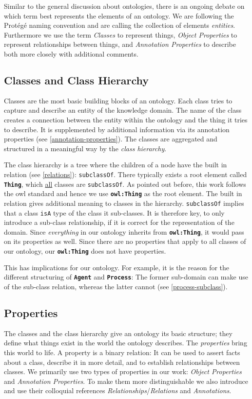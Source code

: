 \documentclass[a4paper, DIV=13, BCOR=0cm]{scrbook}
\newcommand{\class}[1]{\texttt{\textbf{#1}}}
\newcommand{\relation}[1]{\texttt{#1}}
\begin{document}
Similar to the general discussion about ontologies, there is an ongoing debate on which term best represents the elements of an ontology. We are following the Protégé naming convention and are calling the collection of elements \textit{entities}. Furthermore we use the term \textit{Classes} to represent things, \textit{Object Properties} to represent relationships between things, and \textit{Annotation Properties} to describe both more closely with additional comments.

\subsection{Classes and Class Hierarchy}
\label{classes}
Classes are the most basic building blocks of an ontology. Each class tries to capture and describe an entity of the knowledge domain. The name of the class creates a connection between the entity within the ontology and the thing it tries to describe. It is supplemented by additional information via its annotation properties (see \ref{annotation-properties}). The classes are aggregated and structured in a meaningful way by the \textit{class hierarchy}.

The class hierarchy is a tree where the children of a node have the built in relation (see \ref{relations}): \relation{subclassOf}. There typically exists a root element called \class{Thing}, which \underline{all} classes are \relation{subclassOf}. As pointed out before, this work follows the \gls{owl} standard and hence we use \class{owl:Thing} as the root element. The built in relation gives additional meaning to classes in the hierarchy. \relation{subclassOf} implies that a class \relation{isA} type of the class it sub-classes. It is therefore key, to only introduce a sub-class relationship, if it is correct for the representation of the domain. Since \textit{everything} in our ontology inherits from \class{owl:Thing}, it would pass on its properties as well. Since there are no properties that apply to all classes of our ontology, our \class{owl:Thing} does not have properties.

This has implications for our ontology. For example, it is the reason for the different structuring of \class{Agent} and \class{Process}: The former sub-domain can make use of the sub-class relation, whereas the latter cannot (see \autoref{process-subclass}).

\subsection{Properties}
The classes and the class hierarchy give an ontology its basic structure; they define what things exist in the world the ontology describes. The \textit{properties} bring this world to life. A property is a binary relation: It can be used to assert facts about a class, describe it in more detail, and to establish relationships between classes. \cite{w3c-owl-guide} We primarily use two types of properties in our work: \textit{Object Properties} and \textit{Annotation Properties}. To make them more distinguishable we also introduce and use their colloquial references \textit{Relationships}/\textit{Relations} and \textit{Annotations}.
\end{document}
